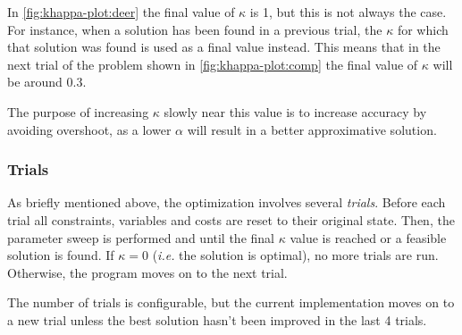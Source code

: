 In \cref{fig:khappa-plot:deer} the final value of \(\kappa\) is 1, but this is not always the case.
For instance, when a solution has been found in a previous trial, the \(\kappa\) for which that solution was found is used as a final value instead.
This means that in the next trial of the problem shown in \cref{fig:khappa-plot:comp} the final value of \(\kappa\) will be around \num{0.3}.

The purpose of increasing \(\kappa\) slowly near this value is to increase accuracy by avoiding overshoot, as a lower \(\alpha\) will result in a better approximative solution.


\subsubsection{Trials}
As briefly mentioned above, the optimization involves several \emph{trials}.
Before each trial all constraints, variables and costs are reset to their original state.
Then, the parameter sweep is performed and until the final \(\kappa\) value is reached or a feasible solution is found.
If \(\kappa=0\) (\emph{i.e.} the solution is optimal), no more trials are run.
Otherwise, the program moves on to the next trial.

The number of trials is configurable, but the current implementation moves on to a new trial unless the best solution hasn't been improved in the last 4 trials.
